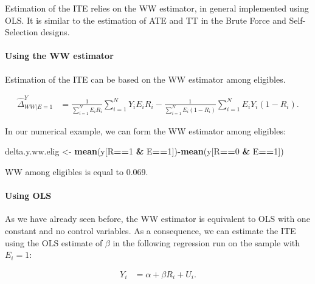 \documentclass[]{book}
\newenvironment{Shaded}{\begin{snugshade}}{\end{snugshade}}
\newcommand{\DecValTok}[1]{\textcolor[rgb]{0.00,0.00,0.81}{#1}}
\newcommand{\KeywordTok}[1]{\textcolor[rgb]{0.13,0.29,0.53}{\textbf{#1}}}
\newcommand{\NormalTok}[1]{#1}
\newcommand{\OperatorTok}[1]{\textcolor[rgb]{0.81,0.36,0.00}{\textbf{#1}}}
\newcommand{\StringTok}[1]{\textcolor[rgb]{0.31,0.60,0.02}{#1}}
\let\oldparagraph\paragraph
\renewcommand{\paragraph}[1]{\oldparagraph{#1}\mbox{}}
\theoremstyle{definition}
\theoremstyle{definition}
\theoremstyle{definition}
\theoremstyle{remark}
\let\BeginKnitrBlock\begin \let\EndKnitrBlock\end
\begin{document}
Estimation of the ITE relies on the WW estimator, in general implemented using OLS.
It is similar to the estimation of ATE and TT in the Brute Force and Self-Selection designs.

\hypertarget{using-the-ww-estimator-2}{%
\paragraph{Using the WW estimator}\label{using-the-ww-estimator-2}}

Estimation of the ITE can be based on the WW estimator among eligibles.

\begin{align*}
  \hat{\Delta}^Y_{WW|E=1} & = \frac{1}{\sum_{i=1}^N E_iR_i}\sum_{i=1}^N Y_iE_iR_i-\frac{1}{\sum_{i=1}^N E_i(1-R_i)}\sum_{i=1}^N E_iY_i(1-R_i).
\end{align*}

\BeginKnitrBlock{example}
\protect\hypertarget{exm:unnamed-chunk-94}{}{\label{exm:unnamed-chunk-94} }In our numerical example, we can form the WW estimator among eligibles:
\EndKnitrBlock{example}

\begin{Shaded}
\begin{Highlighting}[]
\NormalTok{delta.y.ww.elig <-}\StringTok{ }\KeywordTok{mean}\NormalTok{(y[R}\OperatorTok{==}\DecValTok{1} \OperatorTok{&}\StringTok{ }\NormalTok{E}\OperatorTok{==}\DecValTok{1}\NormalTok{])}\OperatorTok{-}\KeywordTok{mean}\NormalTok{(y[R}\OperatorTok{==}\DecValTok{0} \OperatorTok{&}\StringTok{ }\NormalTok{E}\OperatorTok{==}\DecValTok{1}\NormalTok{])}
\end{Highlighting}
\end{Shaded}

WW among eligibles is equal to 0.069.

\hypertarget{using-ols-2}{%
\paragraph{Using OLS}\label{using-ols-2}}

As we have already seen before, the WW estimator is equivalent to OLS with one constant and no control variables.
As a consequence, we can estimate the ITE using the OLS estimate of \(\beta\) in the following regression run on the sample with \(E_i=1\):

\begin{align*}
  Y_i & = \alpha + \beta R_i + U_i.
\end{align*}
\end{document}
